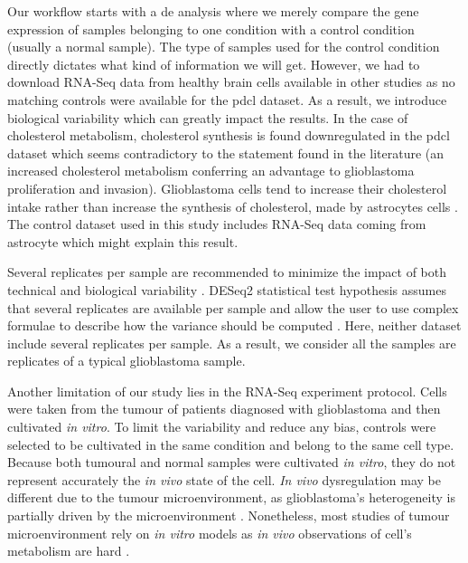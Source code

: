 Our workflow starts with a \acrlong{de} analysis where we merely compare the gene expression of samples belonging to one condition with a control condition (usually a normal sample).
The type of samples used for the control condition directly dictates what kind of information we will get.
However, we had to download RNA-Seq data from healthy brain cells available in other studies as no matching controls were available for the \acrshort{pdcl} dataset.
As a result, we introduce biological variability which can greatly impact the results.
In the case of cholesterol metabolism, cholesterol synthesis is found downregulated in the \acrshort{pdcl} dataset which seems contradictory to the statement found in the literature (an increased cholesterol metabolism conferring an advantage to glioblastoma proliferation and invasion).
Glioblastoma cells tend to increase their cholesterol intake rather than increase the synthesis of cholesterol, made by astrocytes cells \cite*{Villa2016, Pirmoradi2019}.
The control dataset used in this study includes RNA-Seq data coming from astrocyte which might explain this result.

Several replicates per sample are recommended to minimize the impact of both technical and biological variability \cite*{Conesa2016}.
DESeq2 statistical test hypothesis assumes that several replicates are available per sample and allow the user to use complex formulae to describe how the variance should be computed \cite*{Love2014}.
Here, neither dataset include several replicates per sample.
As a result, we consider all the samples are replicates of a typical glioblastoma sample.

Another limitation of our study lies in the RNA-Seq experiment protocol.
Cells were taken from the tumour of patients diagnosed with glioblastoma and then cultivated \textit{in vitro}.
To limit the variability and reduce any bias, controls were selected to be cultivated in the same condition and belong to the same cell type.
Because both tumoural and normal samples were cultivated \textit{in vitro}, they do not represent accurately the \textit{in vivo} state of the cell.
\textit{In vivo} dysregulation may be different due to the tumour microenvironment, as glioblastoma's heterogeneity is partially driven by the microenvironment \cite*{Neftel2019}.
Nonetheless, most studies of tumour microenvironment rely on \textit{in vitro} models as \textit{in vivo} observations of cell's metabolism are hard \cite*{Xiao2019}.


